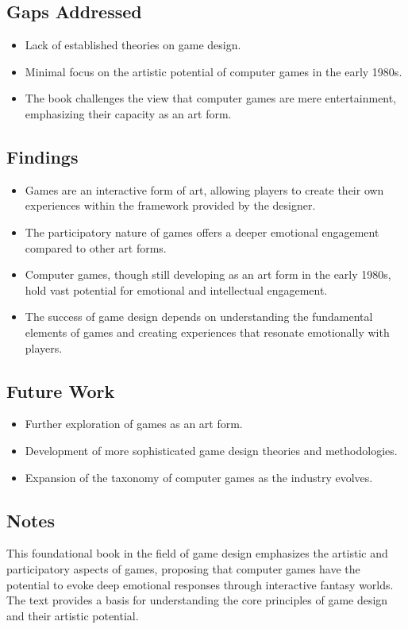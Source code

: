 \subsection{Gaps Addressed}
\begin{itemize}
    \item Lack of established theories on game design.
    \item Minimal focus on the artistic potential of computer games in the early 1980s.
    \item The book challenges the view that computer games are mere entertainment, emphasizing their capacity as an art form.
\end{itemize}

\subsection{Findings}
\begin{itemize}
    \item Games are an interactive form of art, allowing players to create their own experiences within the framework provided by the designer.
    \item The participatory nature of games offers a deeper emotional engagement compared to other art forms.
    \item Computer games, though still developing as an art form in the early 1980s, hold vast potential for emotional and intellectual engagement.
    \item The success of game design depends on understanding the fundamental elements of games and creating experiences that resonate emotionally with players.
\end{itemize}

\subsection{Future Work}
\begin{itemize}
    \item Further exploration of games as an art form.
    \item Development of more sophisticated game design theories and methodologies.
    \item Expansion of the taxonomy of computer games as the industry evolves.
\end{itemize}

\subsection{Notes}
This foundational book in the field of game design emphasizes the artistic and participatory aspects of games, proposing that computer games have the potential to evoke deep emotional responses through interactive fantasy worlds. The text provides a basis for understanding the core principles of game design and their artistic potential.
